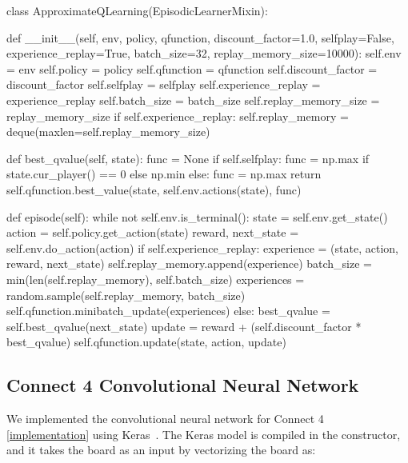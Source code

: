 \documentclass{article}
\newcommand{\GithubURL}[1]{[\href{https://github.com/davidrobles/mlnd-capstone-code/blob/master/#1}{implementation}]}
\begin{document}
\begin{python}
class ApproximateQLearning(EpisodicLearnerMixin):

    def __init__(self, env, policy, qfunction, discount_factor=1.0, selfplay=False,
                 experience_replay=True, batch_size=32, replay_memory_size=10000):
        self.env = env
        self.policy = policy
        self.qfunction = qfunction
        self.discount_factor = discount_factor
        self.selfplay = selfplay
        self.experience_replay = experience_replay
        self.batch_size = batch_size
        self.replay_memory_size = replay_memory_size
        if self.experience_replay:
            self.replay_memory = deque(maxlen=self.replay_memory_size)

    def best_qvalue(self, state):
        func = None
        if self.selfplay:
            func = np.max if state.cur_player() == 0 else np.min
        else:
            func = np.max
        return self.qfunction.best_value(state, self.env.actions(state), func)

    def episode(self):
        while not self.env.is_terminal():
            state = self.env.get_state()
            action = self.policy.get_action(state)
            reward, next_state = self.env.do_action(action)
            if self.experience_replay:
                experience = (state, action, reward, next_state)
                self.replay_memory.append(experience)
                batch_size = min(len(self.replay_memory), self.batch_size)
                experiences = random.sample(self.replay_memory, batch_size)
                self.qfunction.minibatch_update(experiences)
            else:
                best_qvalue = self.best_qvalue(next_state)
                update = reward + (self.discount_factor * best_qvalue)
                self.qfunction.update(state, action, update)
\end{python}

\subsection{Connect 4 Convolutional Neural Network}

We implemented the convolutional neural network for Connect 4
\GithubURL{capstone/rl/value_functions/c4deepnetwork.py\#L42} using Keras~\citep{chollet2015keras}.
The Keras model is compiled in the constructor, and it takes the board as an input by vectorizing
the board as:
\end{document}
